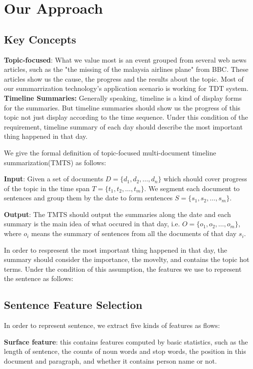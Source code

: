 \documentclass{llncs}
\begin{document}
%
\section{Our Approach}
%

\subsection{Key Concepts}
\textbf{Topic-focused}: What we value most is an event grouped from several web news articles, such as the "the missing of the malaysia airlines plane" from BBC. These articles show us the cause, the progress and the results about the topic. Most of our summarrization technology's application scenario is working for TDT system. \textbf{Timeline Summaries:} Generally speaking, timeline is a kind of display forms for the summaries. But timeline summaries should show us the progress of this topic not just display according to the time sequence. Under this condition of the requirement, timeline summary of each day should describe the most important thing happened in that day.

We give the formal definition of topic-focused multi-document timeline summarization(TMTS) as follows:

\textbf{Input}: Given a set of documents $D=\{d_1, d_2, \dots, d_n\}$ which should cover progress of the topic in the time span $T=\{t_1, t_2, \dots, t_m\}$. We segment each document to sentences and group them by the date to form sentences $S=\{s_1, s_2, \dots, s_m\}$. 

\textbf{Output}: The TMTS should output the summaries along the date and each summary is the main idea of what occured in that day, i.e. $O=\{o_1, o_2, \dots, o_m\}$, where $o_i$ means the summary of sentences from all the documents of that day $s_i$. 

In order to respresent the most important thing happened in that day, the summary should consider the importance, the movelty, and contains the topic hot terms. Under the condition of this assumption, the features we use to represent the sentence as follows:

\subsection{Sentence Feature Selection}

In order to represent sentence, we extract five kinds of features as flows:

\textbf{Surface feature}: this contains features computed by basic statistics, such as the length of sentence, the counts of noun words and stop words, the position in this document and paragraph, and whether it contains person name or not. %
\end{document}
